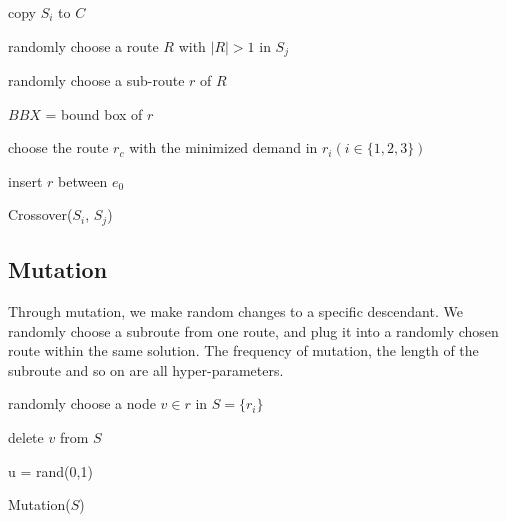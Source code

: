 \documentclass{llncs}
\begin{document}
\begin{minipage}[t]{0.80\textwidth}
       \begin{algorithm}[H]
           
           copy $S_i$ to $C$
           
           randomly choose a route $R$ with $|R|>1$ in $S_j$
           
           randomly choose a sub-route $r$ of $R$
           
           
           $BBX$ = bound box of $r$
           
           
           choose the route $r_c$ with the minimized demand in $r_i(i\in \{1,2,3\})$
           
           
           insert $r$ between $e_0$ 
          
           \caption{Crossover($S_i$, $S_j$)}
        \end{algorithm}
        \end{minipage} 




\subsection{Mutation}
Through mutation, we make random changes to a specific descendant. We randomly choose a subroute from one route, and plug it into a randomly chosen route within the same solution. The frequency of mutation, the length of the subroute and so on are all hyper-parameters.

\begin{minipage}[t]{0.80\textwidth}
       \begin{algorithm}[H]
             randomly choose a node $v\in r$ in $S=\{r_i\}$
             
             delete $v$ from $S$
             
             u = rand(0,1)
             
             
           \caption{Mutation($S$)}
        \end{algorithm}
        \end{minipage} 
        
\end{document}

